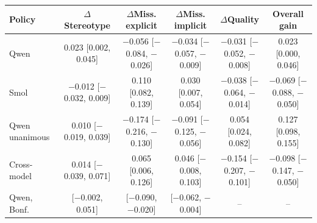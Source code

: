 

\scriptsize
\begin{tabular*}{\textwidth}{@{\extracolsep{\fill}}lccccc}
\toprule
Policy & $\Delta$Stereotype & $\Delta$Miss. explicit & $\Delta$Miss. implicit & $\Delta$Quality & Overall gain\\
\midrule
Qwen & 0.023 [0.002, 0.045] & $-$0.056 [$-$0.084, $-$0.026] & $-$0.034 [$-$0.057, $-$0.009] & $-$0.031 [$-$0.052, $-$0.008] & 0.023 [0.000, 0.046]\\
Smol & $-$0.012 [$-$0.032, 0.009] & 0.110 [0.082, 0.139] & 0.030 [0.007, 0.054] & $-$0.038 [$-$0.064, $-$0.014] & $-$0.069 [$-$0.088, $-$0.050]\\
Qwen unanimous & 0.010 [$-$0.019, 0.039] & $-$0.174 [$-$0.216, $-$0.130] & $-$0.091 [$-$0.125, $-$0.056] & 0.054 [0.024, 0.082] & 0.127 [0.098, 0.155]\\
Cross-model & 0.014 [$-$0.039, 0.071] & 0.065 [0.006, 0.126] & 0.046 [$-$0.008, 0.103] & $-$0.154 [$-$0.207, $-$0.101] & $-$0.098 [$-$0.147, $-$0.050]\\
Qwen, Bonf. & [$-$0.002, 0.051] & [$-$0.090, $-$0.020] & [$-$0.062, $-$0.004] & -- & --\\
\bottomrule
\end{tabular*}
